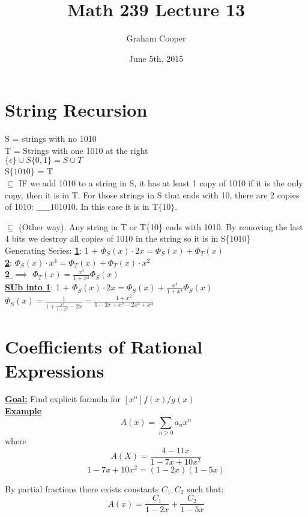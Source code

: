 \documentclass[12pt]{article}
\title{\vspace{-15ex}Math 239 Lecture 13\vspace{-1ex}}
\date{June 5th, 2015}
\author{Graham Cooper}
\newcommand{\myt}[1]{\textbf{\underline{#1}}}
\begin{document}
	\maketitle
	
	\section*{String Recursion}
	S = strings with no 1010\\
	T = Strings with one 1010 at the right\\
	
	$\{ \epsilon \} \cup S\{ 0,1 \} = S \cup T$\\
	
	S$\{ 1010 \}$ = T\\
	
	$\subseteq$ IF we add 1010 to a string in S, it has at least 1 copy of 1010 if it is the only copy, then it is in T. For those strings in S that ends with 10, there are 2 copies of 1010: $\_\_\_\_\_101010$. In this case it is in T$\{ 10 \}$.
	
	$\subseteq$ (Other way). Any string in T or T\{10\} ends with 1010. By removing the last 4 bits we destroy all copies of 1010 in the string so it is in S\{1010\}\\
	
	Generating Series:
	\myt{1}: 1 + $\Phi_S(x) \cdot 2x = \Phi_S(x) + \Phi_T(x)$\\
	\myt{2}: $\Phi_S(x) \cdot x^4 = \Phi_T(x) + \Phi_T(x) \cdot x^2$\\
	\myt{2 $\implies$} $\Phi_T(x) = \frac{x^4}{1+x^2}\Phi_S(x)$\\
	
	\myt{SUb into 1}: 1 + $\Phi_S(x) \cdot 2x = \Phi_S(x) + \frac{x^4}{1+x^2}\Phi_S(x)$\\
	$\Phi_S(x) = \frac{1}{1 + \frac{x^4}{1+x^2} - 2x} = \frac{1+x^2}{1 - 2x + x^2 - 2x^3 + x^4}$\\
	
	\section*{Coefficients of Rational Expressions}
	\myt{Goal:} Find explicit formula for $[x^n]f(x)/g(x)$\\
	
	\myt{Example} 
	$$A(x) = \sum_{n \geq 0}a_nx^n$$
	where 
	$$A(X) = \frac{ 4-11x}{1-7x+10x^2}$$
	$$1-7x+10x^2 = (1-2x)(1-5x)$$
	
	By partial fractions there exists constants $C_1, C_2$ such that:
	$$A(x) = \frac{C_1}{1-2x} + \frac{C_2}{1-5x}$$
	
\end{document}
